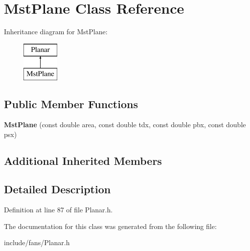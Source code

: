 \hypertarget{class_mst_plane}{}\section{Mst\+Plane Class Reference}
\label{class_mst_plane}
Inheritance diagram for Mst\+Plane\+:\begin{figure}[H]
\begin{center}
\leavevmode
\includegraphics[height=2.000000cm]{d5/dd0/class_mst_plane}
\end{center}
\end{figure}
\subsection*{Public Member Functions}
\begin{DoxyCompactItemize}
\item 
\mbox{\label{class_mst_plane_a7ecba572a4fbe043a4d9847c356c9ab5}} 
{\bfseries Mst\+Plane} (const double area, const double tdx, const double pbx, const double psx)
\end{DoxyCompactItemize}
\subsection*{Additional Inherited Members}


\subsection{Detailed Description}


Definition at line 87 of file Planar.\+h.



The documentation for this class was generated from the following file\+:\begin{DoxyCompactItemize}
\item 
include/fans/Planar.\+h\end{DoxyCompactItemize}
